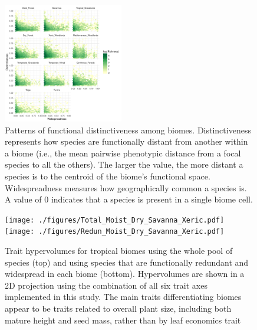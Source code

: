 \documentclass[final]{beamer}
\newlength{\twocolwid}
\begin{document}
\begin{frame}[t]
\begin{columns}[t]
\begin{column}{\twocolwid}
\begin{multicols}{2}{}
\begin{figure}[h]
	\centering
	\includegraphics[width=0.467\textwidth]{./figures/All_biomes_heatmap_logTraits.pdf}
	\caption{ \footnotesize Patterns of functional distinctiveness among biomes. Distinctiveness represents how species are functionally distant from another within a biome (i.e., the mean pairwise phenotypic distance from a focal species to all the others). The larger the value, the more distant a species is to the centroid of the biome's functional space. Widespreadness measures how geographically common a species is. A value of 0 indicates that a species is present in a single biome cell.}
	\label{fig:distinct_common}
\end{figure}


\begin{figure}[h]
	\centering
	\texttt{[image: ./figures/Total\_Moist\_Dry\_Savanna\_Xeric.pdf]}\\
	\texttt{[image: ./figures/Redun\_Moist\_Dry\_Savanna\_Xeric.pdf]}
	\caption{ \footnotesize Trait hypervolumes for tropical biomes using the whole pool of species (top) and using species that are functionally redundant and widespread in each biome (bottom).  Hypervolumes are shown in a 2D projection using the combination of all six trait axes implemented in this study. The main traits differentiating biomes appear to be traits related to overall plant size, including both mature height and seed mass, rather than by leaf economics trait}
	\label{fig:hypervolumes2}
\end{figure}


\end{multicols}




\end{column}
\end{columns}
\end{frame}
\end{document}
